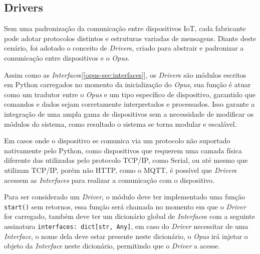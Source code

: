 \subsection{Drivers}

Sem uma padronização da comunicação entre dispositivos IoT, cada fabricante pode adotar protocolos distintos e estruturas variadas de 
mensagens. Diante deste cenário, foi adotado o conceito de \emph{Driver}s, criado para abstrair e padronizar a comunicação entre 
dispositivos e o \emph{Opus}.

Assim como as \emph{Interface}s[\ref{opus-sec:interfaces}], os \emph{Driver}s são módulos escritos em Python carregados no momento da inicialização do \emph{Opus},
sua função é atuar como um tradutor entre o \emph{Opus} e um tipo específico de dispositivo, garantido que 
comandos e dados sejam corretamente interpretados e processados. Isso garante a integração de uma ampla gama de dispositivos 
sem a necessidade de modificar os  módulos do sistema, como resultado o sistema se torna modular e escalável.

Em casos onde o dispositivo se comunica via um protocolo não suportado nativamente pelo Python, como dispositivos que 
requerem uma camada física diferente das utilizadas pelo protocolo TCP/IP, como Serial, ou até mesmo que utilizam TCP/IP, 
porém não HTTP, como o MQTT, é possível que \emph{Driver}s acessem as \emph{Interfaces} para realizar a comunicação com o dispositivo.

Para ser considerado um \emph{Driver}, o módulo deve ter implementado uma função \lstinline{start()} sem retornos, essa função será 
chamada no momento em que o \emph{Driver} for carregado, também deve ter um dicionário global de \emph{Interface}s com a seguinte assinatura
\lstinline{interfaces: dict[str, Any]}, em caso do \emph{Driver} necessitar de uma \emph{Interface}, o nome dela deve estar presente neste dicionário,
o \emph{Opus} irá injetar o objeto da \emph{Interface} neste dicionário, permitindo que o \emph{Driver} a acesse.
